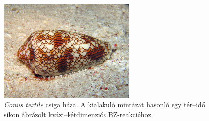 \begin{figure}[!h]
\centering
\includegraphics[width=0.6\textwidth]{img/conus.jpg}
\caption{\emph{Conus textile} csiga háza. A kialakuló mintázat hasonló egy tér--idő síkon ábrázolt kvázi--kétdimenziós BZ-reakcióhoz.}
\label{fig:csiga}
\end{figure}
